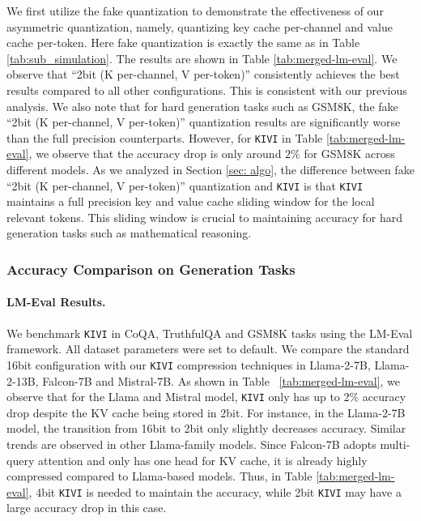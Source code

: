 We first utilize the fake quantization to demonstrate the effectiveness of our asymmetric quantization, namely, quantizing key cache per-channel and value cache per-token. Here fake quantization is exactly the same as in Table \ref{tab:sub_simulation}.
The results are shown in Table \ref{tab:merged-lm-eval}.
We observe that ``2bit (K per-channel, V per-token)'' consistently achieves the best results compared to all other configurations. This is consistent with our previous analysis. We also note that for hard generation tasks such as GSM8K, the fake ``2bit (K per-channel, V per-token)'' quantization results are significantly worse than the full precision counterparts. However, for \texttt{KIVI} in Table \ref{tab:merged-lm-eval}, we observe that the accuracy drop is only around $2\%$ for GSM8K across different models. As we analyzed in Section \ref{sec: algo}, the difference between fake ``2bit (K per-channel, V per-token)'' quantization and \texttt{KIVI} is that \texttt{KIVI} maintains a full precision key and value cache sliding window for the local relevant tokens. This sliding window is crucial to maintaining accuracy for hard generation tasks such as mathematical reasoning. 

\subsubsection{Accuracy Comparison on Generation Tasks}

\paragraph{LM-Eval Results.} We benchmark \texttt{KIVI} in CoQA, TruthfulQA and GSM8K tasks using the LM-Eval framework. All dataset parameters were set to default. We compare the standard 16bit configuration with our \texttt{KIVI} compression techniques in Llama-2-7B, Llama-2-13B, Falcon-7B and Mistral-7B. As shown in Table ~\ref{tab:merged-lm-eval}, we observe that for the Llama and Mistral model, \texttt{KIVI} only has up to 2\% accuracy drop despite the KV cache being stored in 2bit. For instance, in the Llama-2-7B model, the transition from 16bit to 2bit only slightly decreases accuracy. Similar trends are observed in other Llama-family models. Since Falcon-7B adopts multi-query attention and only has one head for KV cache, it is already highly compressed compared to Llama-based models. Thus, in Table \ref{tab:merged-lm-eval}, 4bit \texttt{KIVI} is needed to maintain the accuracy, while 2bit \texttt{KIVI} may have a large accuracy drop in this case.

